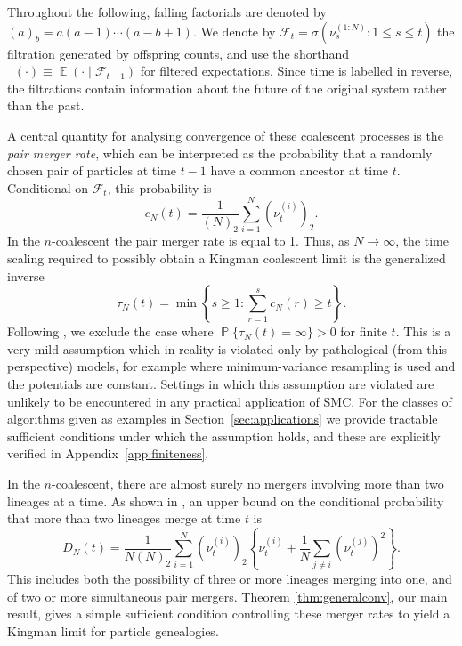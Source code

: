 \documentclass{article}
\theoremstyle{definition}
\DeclareMathOperator{\Prob}{\mathbb{P}}
\DeclareMathOperator{\E}{\mathbb{E}}
\DeclareMathOperator{\Et}{\mathbb{E}_t}
\newcommand{\1}[1]{\mathbbm{1}_{\{#1\}}}
\begin{document}
Throughout the following, falling factorials are denoted by $(a)_b = a(a-1) \cdots (a-b+1)$. We denote by $\mathcal{F}_{t} = \sigma(\nu_s^{(1:N)} : 1 \leq s \leq t)$ the filtration generated by offspring counts, and use the shorthand $\Et(\cdot) \equiv \E(\cdot \mid \mathcal{F}_{t-1})$ for filtered expectations. Since time is labelled in reverse, the filtrations contain information about the future of the original system rather than the past.

A central quantity for analysing convergence of these coalescent processes is the \emph{pair merger rate}, which can be interpreted as the probability that a randomly chosen pair of particles at time $t-1$ have a common ancestor at time $t$. Conditional on $\mathcal{F}_t$, this probability is
\begin{equation}\label{eq:coalescence_rate}
c_N(t) = \frac{1}{(N)_2}\sum_{i=1}^N (\nu_t^{(i)})_2 .
\end{equation}
In the $n$-coalescent the pair merger rate is equal to 1. 
Thus, as $N\to\infty$, the time scaling required to possibly obtain a Kingman coalescent limit is the generalized inverse
\begin{equation*}
\tau_N(t) = \min \left\{ s\geq 1 : \sum_{r=1}^s c_N(r) \geq t \right\} .
\end{equation*}
Following \citet{mohle1998}, we exclude the case where $\Prob\{ \tau_N(t) = \infty \} >0$ for finite $t$. 
This is a very mild assumption which in reality is violated only by pathological (from this perspective) models, for example where minimum-variance resampling is used and the potentials are constant. Settings in which this assumption are violated are unlikely to be encountered in any practical application of SMC. For the classes of algorithms given as examples in Section~\ref{sec:applications} we provide tractable sufficient conditions under which the assumption holds, and these are explicitly verified in Appendix~\ref{app:finiteness}.

In the $n$-coalescent, there are almost surely no mergers involving more than two lineages at a time. 
As shown in \citet[Lemma 1, Case 3]{koskela2018}, an upper bound on the conditional probability that more than two lineages merge at time $t$ is
\begin{equation*}
D_N(t) = \frac{1}{N(N)_2} \sum_{i=1}^N (\nu_t^{(i)})_2 \left\{\nu_t^{(i)} + \frac{1}{N} \sum_{j\neq i} (\nu_t^{(j)})^2 \right\} .
\end{equation*}
This includes both the possibility of three or more lineages merging into one, and of two or more simultaneous pair mergers.
Theorem \ref{thm:generalconv}, our main result, gives a simple sufficient condition controlling these merger rates to yield a Kingman limit for particle genealogies.
\end{document}
